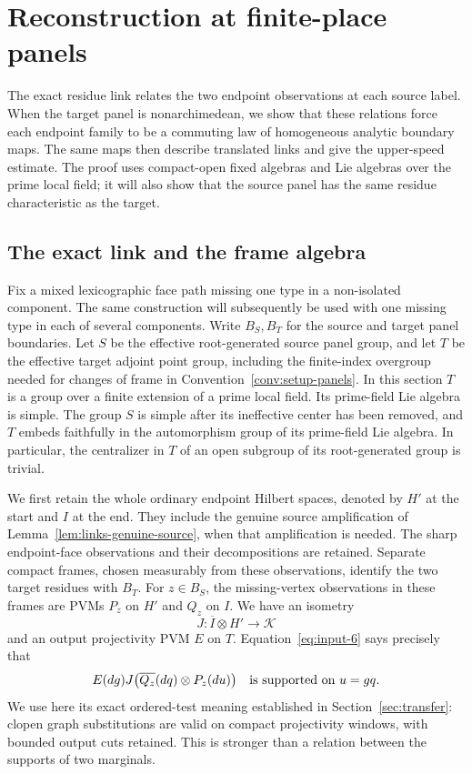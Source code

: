 \section{Reconstruction at finite-place panels}
\label{sec:finite}

The exact residue link relates the two endpoint observations at each
source label.  When the target panel is nonarchimedean, we show that these
relations force each endpoint family to be a commuting law of homogeneous
analytic boundary maps.  The same maps then describe translated links and
give the upper-speed estimate.  The proof uses compact-open fixed algebras
and Lie algebras over the prime local field; it will also show that the
source panel has the same residue characteristic as the target.

\subsection{The exact link and the frame algebra}

Fix a mixed lexicographic face path missing one type in a non-isolated
component.  The same
construction will subsequently be used with one missing type in each of
several components.  Write $B_S,B_T$ for the source and target panel
boundaries.  Let $S$ be the effective root-generated source panel group,
and let $T$ be the effective target adjoint point group, including
the finite-index overgroup needed for changes of frame in
Convention~\ref{conv:setup-panels}.
In this section $T$ is a group over a finite extension of a prime local
field.  Its prime-field Lie algebra is simple.  The group $S$ is simple
after its ineffective center has been removed, and $T$ embeds faithfully
in the automorphism group of its prime-field Lie algebra.  In particular,
the centralizer in $T$ of an open subgroup of its root-generated group is
trivial.

We first retain the whole ordinary endpoint Hilbert spaces, denoted by
$H'$ at the start and $I$ at the end.  They include the genuine source
amplification of Lemma~\ref{lem:links-genuine-source}, when that amplification is
needed.  The sharp endpoint-face observations and their decompositions
are retained.  Separate compact frames, chosen measurably from these
observations, identify the two target residues with $B_T$.
For $z\in B_S$, the missing-vertex observations in these frames are PVMs
$P_z$ on $H'$ and $Q_z$ on $I$.  We have an isometry
\begin{equation}
 J:\overline I\otimes H'\longrightarrow\mathcal K
 \label{eq:finite-link}
\end{equation}
and an output projectivity PVM $E$ on $T$.  Equation~\eqref{eq:input-6}
says precisely that
\[
 E(dg)J\bigl(\overline{Q_z}(dq)\otimes P_z(du)\bigr)
 \quad\hbox{is supported on }u=gq.
\]
We use here its exact ordered-test meaning established in
Section~\ref{sec:transfer}: clopen graph substitutions are valid on
compact projectivity windows, with bounded output cuts retained.
This is stronger than a relation between the supports of two marginals.

